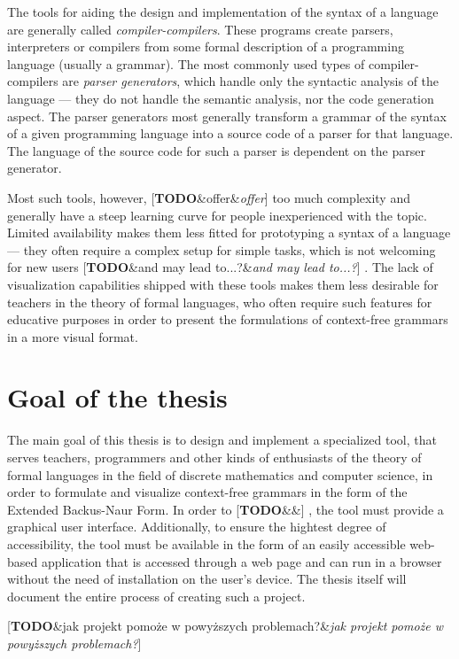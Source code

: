 \documentclass[english,engineering]{wizthesis}
\newcommand{\todo}[1]{%
  {\color{red}[\textbf{TODO}\ifx&#1&{}\else{ }\fi\emph{#1}]}%
}
\begin{document}
The tools for aiding the design and implementation of the syntax of a language
are generally called \emph{compiler-compilers}. These programs create parsers,
interpreters or compilers from some formal description of a programming
language (usually a grammar). The most commonly used types of
compiler-compilers are \emph{parser generators}, which handle only the
syntactic analysis of the language --- they do not handle the semantic analysis,
nor the code generation aspect. The parser generators most generally transform a
grammar of the syntax of a given programming language into a source code of a
parser for that language. The language of the source code for such a parser is
dependent on the parser generator.

Most such tools, however, \todo{offer} too much complexity and generally have a steep
learning curve for people inexperienced with the topic. Limited availability
makes them less fitted for prototyping a syntax of a language --- they often
require a complex setup for simple tasks, which is not welcoming for new users
\todo{and may lead to...?}. The lack of visualization capabilities shipped with
these tools makes them less desirable for teachers in the theory of formal
languages, who often require such features for educative purposes in order to
present the formulations of context-free grammars in a more visual format.

\section{Goal of the thesis}

The main goal of this thesis is to design and implement a specialized tool, that
serves teachers, programmers and other kinds of enthusiasts of the theory of
formal languages in the field of discrete mathematics and computer science, in
order to formulate and visualize context-free grammars in the form of the
Extended Backus-Naur Form. In order to \todo{}, the tool must provide a
graphical user interface. Additionally, to ensure the hightest degree of
accessibility, the tool must be available in the form of an easily accessible
web-based application that is accessed through a web page and can run in a
browser without the need of installation on the user's device. The thesis itself
will document the entire process of creating such a project.

\todo{jak projekt pomoże w powyższych problemach?}
\end{document}
